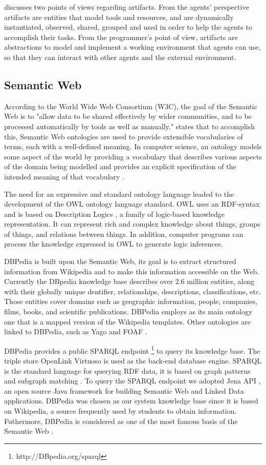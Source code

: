 \documentclass[a4paper,twoside]{article}
\begin{document}
\cite{ref5} discusses two points of views regarding artifacts. From the agents' perspective artifacts are entities that model tools and resources, and are dynamically instantiated, observed, shared, grouped and used in order to help the agents to accomplish their tasks. From the programmer's point of view, artifacts are abstractions to model and implement a working environment that agents can use, so that they can interact with other agents and the external environment.

\subsection{Semantic Web}

\noindent According to the World Wide Web Consortium (W3C), the goal of the Semantic Web is to "allow data to be shared effectively by wider communities, and to be processed automatically by tools as well as manually." \cite{ref53} states that to accomplish this, Semantic Web ontologies are used to provide extensible vocabularies of terms, each with a well-defined meaning. In computer science, an ontology models some aspect of the world by providing a vocabulary that describes various aspects of the domain being modelled and provides an explicit specification of the intended meaning of that vocabulary \cite{ref53}.

The need for an expressive and standard ontology language leaded to the development of the OWL ontology language standard. OWL uses an RDF-syntax and is based on Description Logics \cite{refDL}, a family of logic-based knowledge representation. It can represent rich and complex knowledge about things, groups of things, and relations between things. In addition, computer programs can process the knowledge expressed in OWL to generate logic inferences.

DBPedia \cite{refXYZ} is built upon the Semantic Web, its goal is to extract structured information from Wikipedia and to make this information accessible on the Web. Currently the DBpedia knowledge base describes over 2.6 million entities, along with their globally unique dentifier, relationships, descriptions, classifications, etc. Those entities cover domains such as geographic information, people, companies, films, books, and scientific publications. DBPedia employs as its main ontology one that is a mapped version of the Wikipedia templates. Other ontologies are linked to DBPedia, such as Yago \cite{refYAGO} and FOAF \cite{refFOAF}.

DBPedia provides a public SPARQL endpoint \footnote{http://DBpedia.org/sparql} to query its knowledge base. The triple store OpenLink Virtuoso \cite{refVIRT} is used as the back-end database engine. SPARQL is the standard language for querying RDF data, it is based on graph patterns and subgraph matching \cite{refABC,refDEF}. To query the SPARQL endpoint we adopted Jena API \cite{refJENA}, an open source Java framework for building Semantic Web and Linked Data applications. DBPedia was chosen as our system knowledge base since it is based on Wikipedia, a source frequently used by students to obtain information. Futhermore, DBPedia is considered as one of the most famous basis of the Semantic Web \cite{refEntrevista}.
\end{document}
